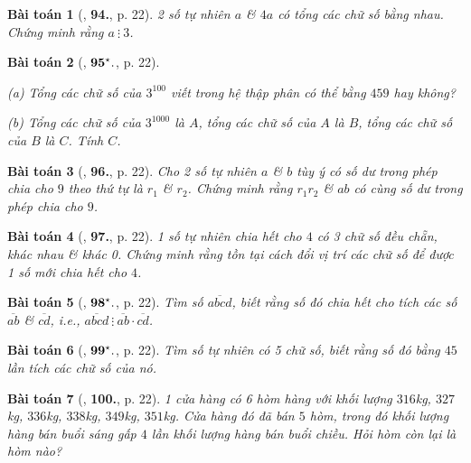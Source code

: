 \documentclass[oneside]{book}
\numberwithin{equation}{section}
\newtheorem{baitoan}{Bài toán}[section]
\begin{document}
\begin{baitoan}[\cite{Binh_Toan_6_tap_1}, \textbf{94.}, p. 22]
	2 số tự nhiên $a$ \& $4a$ có tổng các chữ số bằng nhau. Chứng minh rằng $a\ \vdots\ 3$.
\end{baitoan}

\begin{baitoan}[\cite{Binh_Toan_6_tap_1}, $\bf 95^\star.$, p. 22]
	\begin{enumerate*}
		\item[(a)] Tổng các chữ số của $3^{100}$ viết trong hệ thập phân có thể bằng $459$ hay không?
		\item[(b)] Tổng các chữ số của $3^{1000}$ là $A$, tổng các chữ số của $A$ là $B$, tổng các chữ số của $B$ là $C$. Tính $C$.
	\end{enumerate*}
\end{baitoan}

\begin{baitoan}[\cite{Binh_Toan_6_tap_1}, \textbf{96.}, p. 22]
	Cho 2 số tự nhiên $a$ \& $b$ tùy ý có số dư trong phép chia cho $9$ theo thứ tự là $r_1$ \& $r_2$. Chứng minh rằng $r_1r_2$ \& $ab$ có cùng số dư trong phép chia cho $9$.
\end{baitoan}

\begin{baitoan}[\cite{Binh_Toan_6_tap_1}, \textbf{97.}, p. 22]
	1 số tự nhiên chia hết cho $4$ có 3 chữ số đều chẵn, khác nhau \& khác 0. Chứng minh rằng tồn tại cách đổi vị trí các chữ số để được 1 số mới chia hết cho $4$.
\end{baitoan}

\begin{baitoan}[\cite{Binh_Toan_6_tap_1}, $\bf 98^\star.$, p. 22]
	Tìm số $\overline{abcd}$, biết rằng số đó chia hết cho tích các số $\overline{ab}$ \& $\overline{cd}$, i.e., $\overline{abcd}\ \vdots\ \overline{ab}\cdot\overline{cd}$.
\end{baitoan}

\begin{baitoan}[\cite{Binh_Toan_6_tap_1}, $\bf 99^\star.$, p. 22]
	Tìm số tự nhiên có 5 chữ số, biết rằng số đó bằng $45$ lần tích các chữ số của nó.
\end{baitoan}	

\begin{baitoan}[\cite{Binh_Toan_6_tap_1}, \textbf{100.}, p. 22]
	1 cửa hàng có 6 hòm hàng với khối lượng $316$kg, $327$kg, $336$kg, $338$kg, $349$kg, $351$kg. Cửa hàng đó đã bán $5$ hòm, trong đó khối lượng hàng bán buổi sáng gấp $4$ lần khối lượng hàng bán buổi chiều. Hỏi hòm còn lại là hòm nào?
\end{baitoan}
\end{document}
